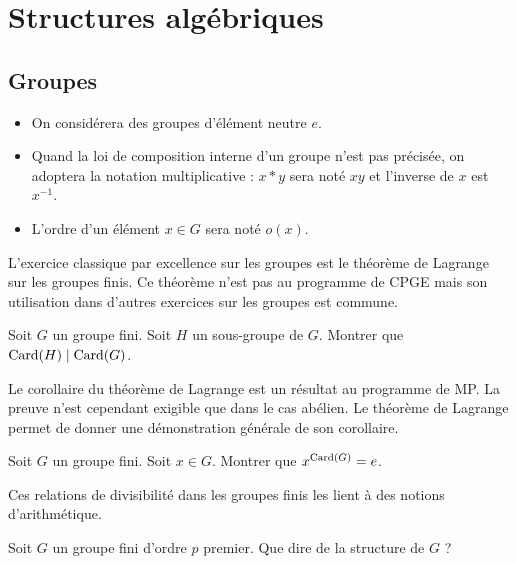 \documentclass[12pt,a4paper]{exo_book}
\begin{document}
\chapter{Structures algébriques}

\section{Groupes}

\begin{notation}
\hspace{1pt}
\begin{itemize}
    \item On considérera des groupes d'élément neutre $e$.
    \item Quand la loi de composition interne d'un groupe n'est pas précisée, on adoptera la notation multiplicative : $x * y$ sera noté $xy$ et l'inverse de $x$ est $x^{-1}$.
    \item L'ordre d'un élément $x\in G$ sera noté $o(x)$.
\end{itemize}
\end{notation}

L'exercice classique par excellence sur les groupes est le théorème de Lagrange sur les groupes finis. Ce théorème n'est pas au programme de CPGE mais son utilisation dans d'autres exercices sur les groupes est commune.

\begin{exo}
 Soit $G$ un groupe fini. Soit $H$ un sous-groupe de $G$. Montrer que $\operatorname{Card} (H) \mid \operatorname{Card} (G)$.
\end{exo}

Le corollaire du théorème de Lagrange est un résultat au programme de MP. La preuve n'est cependant exigible que dans le cas abélien. Le théorème de Lagrange permet de donner une démonstration générale de son corollaire.

\begin{exo}
 Soit $G$ un groupe fini. Soit $x \in G$. Montrer que $x ^ {\operatorname{Card} (G)} = e$.
\end{exo}

Ces relations de divisibilité dans les groupes finis les lient à des notions d'arithmétique.

\begin{exo}
    Soit $G$ un groupe fini d'ordre $p$ premier. Que dire de la structure de $G$ ?
\end{exo}
\end{document}
